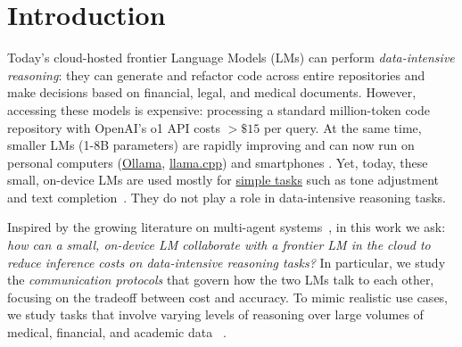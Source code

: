 

\section{Introduction}

\label{sec:intro}
Today's cloud-hosted frontier Language Models (LMs) can perform \textit{data-intensive reasoning}: they can generate and refactor code across entire repositories and make decisions based on financial, legal, and medical documents. However, accessing these models is expensive: processing a standard million-token code repository with OpenAI's o1 API costs $>\$15$ per query. 
% 
At the same time, smaller LMs (1-8B parameters) are rapidly improving and can now run on personal computers (\href{https://ollama.com/}{Ollama}, \href{https://github.com/ggerganov/llama.cpp}{llama.cpp}) and smartphones \citep{mehta2024openelm,yi2024phonelm,xu2024empowering}. 
%
Yet, today, these small, on-device LMs are used mostly for \href{https://machinelearning.apple.com/research/introducing-apple-foundation-models}{simple tasks} such as tone adjustment and text completion~\citep{gunter2024apple}. They do not play a role in data-intensive reasoning tasks.

Inspired by the growing literature on multi-agent systems~\citep{wang2024mixture,guo2024large}, in this work we ask: \textit{how can a small, on-device LM collaborate with a frontier LM in the cloud to reduce inference costs on data-intensive reasoning tasks?} In particular, we study the \textit{communication protocols} that govern how the two LMs talk to each other, focusing on the tradeoff between cost and accuracy.
% 
To mimic realistic use cases, we study tasks that involve varying levels of reasoning over large volumes of medical, financial, and academic data ~\citep{islam2023financebench, adams2024longhealth, dasigi2021dataset}.
% 


